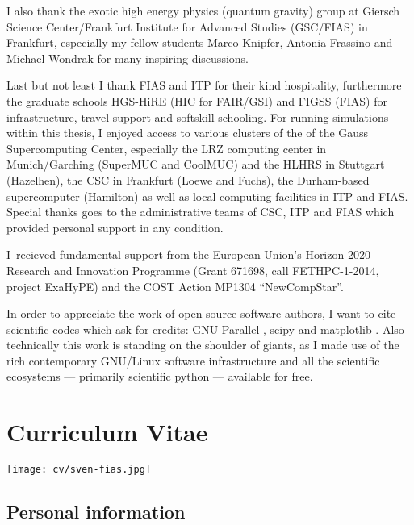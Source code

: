 \begin{fullwidth}
    I also thank the exotic high energy physics (quantum gravity) group at 
    Giersch Science Center/Frankfurt Institute for Advanced Studies
    (GSC/FIAS) in Frankfurt, especially my fellow students
    Marco Knipfer, Antonia Frassino and Michael Wondrak for many inspiring
    discussions.
	
	Last but not least I thank FIAS and ITP for their kind hospitality, 
	furthermore the graduate schools
	HGS-HiRE (HIC for FAIR/GSI) and FIGSS (FIAS) for infrastructure, travel 
	support and softskill
	schooling. For running simulations within this thesis, I enjoyed access to 
	various clusters of the
	of the Gauss Supercomputing Center, especially the LRZ computing center in 
	Munich/Garching
	(SuperMUC and CoolMUC) and the HLHRS in 
	Stuttgart (Hazelhen),
	the CSC in Frankfurt (Loewe and Fuchs), the Durham-based supercomputer 
	(Hamilton) as well as local
	computing facilities in ITP and FIAS. Special thanks goes to the 
	administrative teams of CSC, ITP and FIAS which provided personal support 
	in any condition.
	
	I~recieved fundamental support from 
	the European Union's
	Horizon 2020 Research and Innovation Programme (Grant 671698, call 
	FETHPC-1-2014, project ExaHyPE)
	and the COST Action MP1304 ``NewCompStar''.
	
    In order to appreciate the work of open source software authors, I want to
    cite scientific codes which ask for credits:
	GNU Parallel \cite{Tange2011a}, scipy \cite{SciPy} and matplotlib 
	\cite{matplotlib}. Also technically this work is standing on the shoulder
	of giants, as I made use of the rich contemporary GNU/Linux software
	infrastructure and all the scientific ecosystems --- primarily scientific
	python --- available for free.
	

\newpage
\chapter*{Curriculum Vitae}
\label{sec:cv}
%
%
%
\begin{multicols}{2}
%
\noindent
\texttt{[image: cv/sven-fias.jpg]}
\section*{Personal information}



\end{multicols}
\end{fullwidth}

